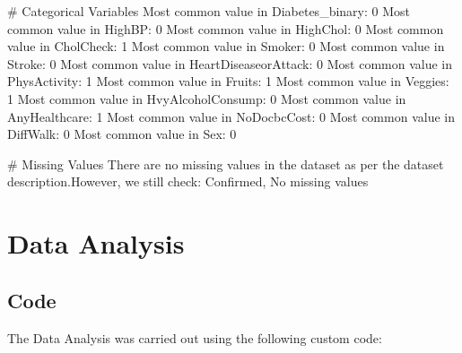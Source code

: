 \documentclass[11pt]{article}
\begin{document}
\begin{codeoutput}
# Categorical Variables
Most common value in Diabetes_binary: 0
Most common value in HighBP: 0
Most common value in HighChol: 0
Most common value in CholCheck: 1
Most common value in Smoker: 0
Most common value in Stroke: 0
Most common value in HeartDiseaseorAttack: 0
Most common value in PhysActivity: 1
Most common value in Fruits: 1
Most common value in Veggies: 1
Most common value in HvyAlcoholConsump: 0
Most common value in AnyHealthcare: 1
Most common value in NoDocbcCost: 0
Most common value in DiffWalk: 0
Most common value in Sex: 0

# Missing Values
There are no missing values in the dataset as per the dataset description.However, we still check:
Confirmed, No missing values



\end{codeoutput}

\section{Data Analysis}
\subsection{{Code}}
The Data Analysis was carried out using the following custom code:
\end{document}
